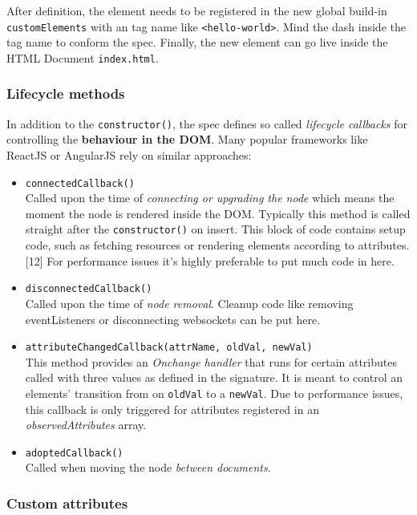 \documentclass[]{assets/latex/ieee}
\providecommand{\tightlist}{%
  \setlength{\itemsep}{0pt}\setlength{\parskip}{0pt}}
\begin{document}
After definition, the element needs to be registered in the new global
build-in \texttt{customElements} with an tag name like
\texttt{\textless{}hello-world\textgreater{}}. Mind the dash inside the
tag name to conform the spec. Finally, the new element can go live
inside the HTML Document \texttt{index.html}.

\subsubsection{Lifecycle methods}\label{lifecycle-methods}

In addition to the \texttt{constructor()}, the spec defines so called
\emph{lifecycle callbacks} for controlling the \textbf{behaviour in the
DOM}. Many popular frameworks like ReactJS or AngularJS rely on similar
approaches:

\begin{itemize}
\tightlist
\item
  \texttt{connectedCallback()}\\
  Called upon the time of \emph{connecting or upgrading the node} which
  means the moment the node is rendered inside the DOM. Typically this
  method is called straight after the \texttt{constructor()} on insert.
  This block of code contains setup code, such as fetching resources or
  rendering elements according to attributes.{[}12{]} For performance
  issues it's highly preferable to put much code in here.
\item
  \texttt{disconnectedCallback()}\\
  Called upon the time of \emph{node removal}. Cleanup code like
  removing eventListeners or disconnecting websockets can be put here.
\item
  \texttt{attributeChangedCallback(attrName,\ oldVal,\ newVal)}\\
  This method provides an \emph{Onchange handler} that runs for certain
  attributes called with three values as defined in the signature. It is
  meant to control an elements' transition from on \texttt{oldVal} to a
  \texttt{newVal}. Due to performance issues, this callback is only
  triggered for attributes registered in an \emph{observedAttributes}
  array.
\item
  \texttt{adoptedCallback()}\\
  Called when moving the node \emph{between documents}.
\end{itemize}

\subsubsection{Custom attributes}\label{custom-attributes}
\end{document}
